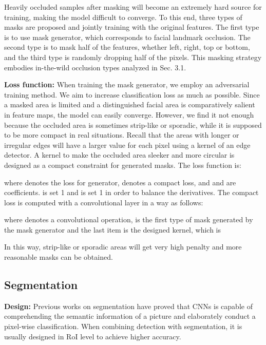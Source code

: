 \documentclass[10pt,twocolumn,letterpaper]{article}
\begin{document}
Heavily occluded samples after masking will become an extremely hard source for training, making the model difficult to converge. To this end, three types of masks are proposed and jointly training with the original features. The first type is to use mask generator, which corresponds to facial landmark occlusion. The second type is to mask half of the features, whether left, right, top or bottom, and the third type is randomly dropping half of the pixels. This masking strategy embodies in-the-wild occlusion types analyzed in Sec. 3.1.

 \textbf{Loss function: }When training the mask generator, we employ an adversarial training method. We aim to increase classification loss as much as possible. Since a masked area is limited and a distinguished facial area is comparatively salient in feature maps, the model can easily converge. However, we find it not enough because the occluded area is sometimes strip-like or sporadic, while it is supposed to be more compact in real situations. Recall that the areas with longer or irregular edges will have a larger value for each pixel using a kernel of an edge detector. A kernel to make the occluded area sleeker and more circular is designed as a compact constraint for generated masks. The loss function is:

where  denotes the loss for generator,  denotes a compact loss, and  and  are coefficients.  is set 1 and  is set 1 in order to balance the derivatives. The compact loss is computed with a convolutional layer in a way as follows:

where  denotes a convolutional operation,  is the first type of mask generated by the mask generator and the last item is the designed kernel, which is

In this way, strip-like or sporadic areas will get very high penalty and more reasonable masks can be obtained. 



\subsection{Segmentation}
 \textbf{Design:} Previous works on segmentation have proved that CNNs is capable of comprehending the semantic information of a picture and elaborately conduct a pixel-wise classification. When combining detection with segmentation, it is usually designed in RoI level to achieve higher accuracy. 
 
\end{document}
